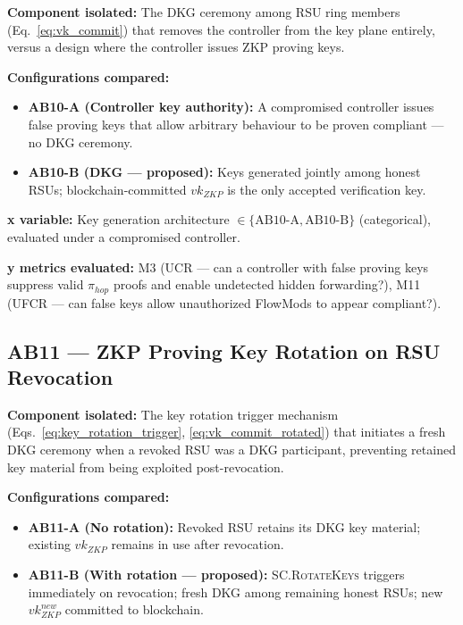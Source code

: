 \documentclass[12pt, a4paper]{report}
\begin{document}
{{\textbf{Component isolated:}
The \ac{DKG} ceremony among \ac{RSU} ring members
(Eq.~\ref{eq:vk_commit}) that removes the controller
from the key plane entirely, versus a design where
the controller issues \ac{ZKP} proving keys.

\textbf{Configurations compared:}
\begin{itemize}
    \item \textbf{AB10-A (Controller key authority):}
    A compromised controller issues false proving keys
    that allow arbitrary behaviour to be proven
    compliant — no \ac{DKG} ceremony.
    \item \textbf{AB10-B (\ac{DKG} — proposed):}
    Keys generated jointly among honest \ac{RSU}s;
    blockchain-committed $vk_{ZKP}$ is the only
    accepted verification key.
\end{itemize}

\textbf{x variable:} Key generation architecture
$\in \{\text{AB10-A}, \text{AB10-B}\}$ (categorical),
evaluated under a compromised controller.

\textbf{y metrics evaluated:} M3 (UCR — can a
controller with false proving keys suppress valid
$\pi_{hop}$ proofs and enable undetected hidden
forwarding?), M11 (UFCR — can false keys allow
unauthorized FlowMods to appear compliant?).


\subsection{AB11 — ZKP Proving Key Rotation on
RSU Revocation}
\label{sec:ab11}

\textbf{Component isolated:}
The key rotation trigger mechanism
(Eqs.~\ref{eq:key_rotation_trigger},
\ref{eq:vk_commit_rotated}) that initiates a fresh
\ac{DKG} ceremony when a revoked \ac{RSU} was a
\ac{DKG} participant, preventing retained key
material from being exploited post-revocation.

\textbf{Configurations compared:}
\begin{itemize}
    \item \textbf{AB11-A (No rotation):} Revoked
    \ac{RSU} retains its \ac{DKG} key material;
    existing $vk_{ZKP}$ remains in use after
    revocation.
    \item \textbf{AB11-B (With rotation —
    proposed):} \textsc{SC.RotateKeys} triggers
    immediately on revocation; fresh \ac{DKG}
    among remaining honest \ac{RSU}s; new
    $vk_{ZKP}^{new}$ committed to blockchain.
\end{itemize}

}}
\end{document}
